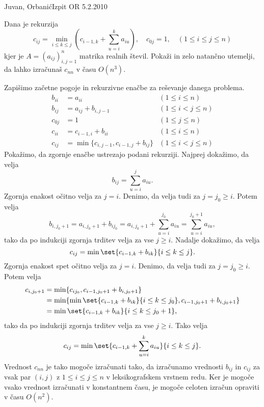 \begin{naloga}{Juvan, Orbanić}{Izpit OR 5.2.2010}
\begin{vprasanje}
Dana je rekurzija
$$
c_{ij} = \min_{i \le k \le j} \left(c_{i-1,k} + \sum_{u=i}^k a_{iu}\right),
\quad c_{0j} = 1 , \quad (1 \le i \le j \le n)
$$
kjer je $A = (a_{ij})_{i,j=1}^n$ matrika realnih števil.
Pokaži in zelo natančno utemelji,
da lahko izračunaš $c_{nn}$ v času $O(n^3)$.
\end{vprasanje}

\begin{odgovor}
Zapišimo začetne pogoje in rekurzivne enačbe za reševanje danega problema.
\begin{align*}
b_{ii} &= a_{ii} & (1 \le i \le n) \\
b_{ij} &= a_{ij} + b_{i,j-1} & (1 \le i < j \le n) \\[1ex]
c_{0j} &= 1 & (1 \le j \le n) \\
c_{ii} &= c_{i-1,i} + b_{ii} & (1 \le i \le n) \\
c_{ij} &= \min\{c_{i,j-1}, c_{i-1,j} + b_{ij}\} & (1 \le i < j \le n)
\end{align*}
Pokažimo, da zgornje enačbe ustrezajo podani rekurziji.
Najprej dokažimo, da velja
$$
b_{ij} = \sum_{u=i}^j a_{iu} .
$$
Zgornja enakost očitno velja za $j = i$.
Denimo, da velja tudi za $j = j_0 \ge i$.
Potem velja
$$
b_{i,j_0+1} = a_{i,j_0+1} + b_{ij_0} = a_{i,j_0+1} + \sum_{u=i}^{j_0} a_{iu}
= \sum_{u=i}^{j_0+1} a_{iu} ,
$$
tako da po indukciji zgornja trditev velja za vse $j \ge i$.
Nadalje dokažimo, da velja
$$
c_{ij} = \min\set{c_{i-1,k} + b_{ik}}{i \le k \le j} .
$$
Zgornja enakost spet očitno velja za $j = i$.
Denimo, da velja tudi za $j = j_0 \ge i$.
Potem velja
\begin{align*}
c_{i,j_0+1} &= \min\{c_{ij_0}, c_{i-1,j_0+1} + b_{i,j_0+1}\} \\
&= \min\{\min\set{c_{i-1,k} + b_{ik}}{i \le k \le j_0}, c_{i-1,j_0+1} + b_{i,j_0+1}\} \\
&= \min\set{c_{i-1,k} + b_{ik}}{i \le k \le j_0+1} ,
\end{align*}
tako da po indukciji zgornja trditev velja za vse $j \ge i$.
Tako velja
$$
c_{ij} = \min\set{c_{i-1,k} + \sum_{u=i}^k a_{iu}}{i \le k \le j} .
$$
Vrednost $c_{nn}$ je tako mogoče izračunati tako,
da izračunamo vrednosti $b_{ij}$ in $c_{ij}$
za vsak par $(i, j)$ z $1 \le i \le j \le n$
v leksikografskem vrstnem redu.
Ker je mogoče vsako vrednost izračunati v konstantnem času,
je mogoče celoten izračun opraviti v času $O(n^2)$.
\end{odgovor}
\end{naloga}
